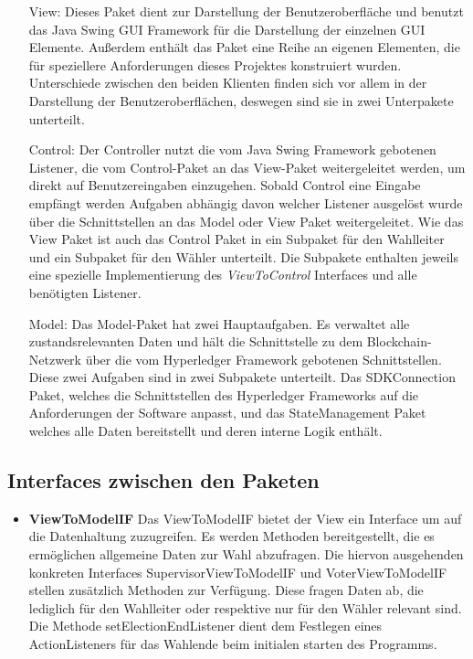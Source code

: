 \documentclass[parskip=full]{scrartcl}
\newcommand{\textitx}[1]{\mbox{\textit{#1}}}
\newcommand{\fakeparagraph}[1]{\textbf{#1}}
\begin{document}
	\begin{itemize}
		\item[View:] Dieses Paket dient zur Darstellung der Benutzeroberfläche und benutzt das Java Swing GUI Framework für die Darstellung der einzelnen GUI Elemente. Außerdem enthält das Paket eine Reihe an eigenen Elementen, die für speziellere Anforderungen dieses Projektes konstruiert wurden. Unterschiede zwischen den beiden Klienten finden sich vor allem in der Darstellung der Benutzeroberflächen, deswegen sind sie in zwei Unterpakete unterteilt.
		\item[Control:] Der Controller nutzt die vom Java Swing Framework gebotenen Listener, die vom Control-Paket an das View-Paket weitergeleitet werden, um direkt auf Benutzereingaben einzugehen. Sobald Control eine Eingabe empfängt werden Aufgaben abhängig davon welcher Listener ausgelöst wurde über die Schnittstellen an das Model oder View Paket weitergeleitet. Wie das View Paket ist auch das Control Paket in ein Subpaket für den Wahlleiter und ein Subpaket für den Wähler unterteilt. Die Subpakete enthalten jeweils eine spezielle Implementierung des \textitx{ViewToControl} Interfaces und alle benötigten Listener.
		\item[Model:] Das Model-Paket hat zwei Hauptaufgaben. Es verwaltet alle zustandsrelevanten Daten und hält die Schnittstelle zu dem Blockchain-Netzwerk über die vom Hyperledger Framework gebotenen Schnittstellen. Diese zwei Aufgaben sind in zwei Subpakete unterteilt. Das SDKConnection Paket, welches die Schnittstellen des Hyperledger Frameworks auf die Anforderungen der Software anpasst, und das StateManagement Paket welches alle Daten bereitstellt und deren interne Logik enthält.   
	\end{itemize} 
\subsection{Interfaces zwischen den Paketen}
	\begin{itemize}
	\item\fakeparagraph{ViewToModelIF} Das ViewToModelIF bietet der View ein Interface um auf die Datenhaltung zuzugreifen.
	Es werden Methoden bereitgestellt, die es ermöglichen allgemeine Daten zur Wahl abzufragen.
	Die hiervon ausgehenden konkreten Interfaces SupervisorViewToModelIF und VoterViewToModelIF stellen zusätzlich Methoden zur Verfügung. Diese fragen Daten ab, die lediglich für den Wahlleiter oder respektive nur für den Wähler relevant sind.
	Die Methode setElectionEndListener dient dem Festlegen eines ActionListeners für das Wahlende beim initialen starten des Programms.
	\end{itemize} 
\end{document}
